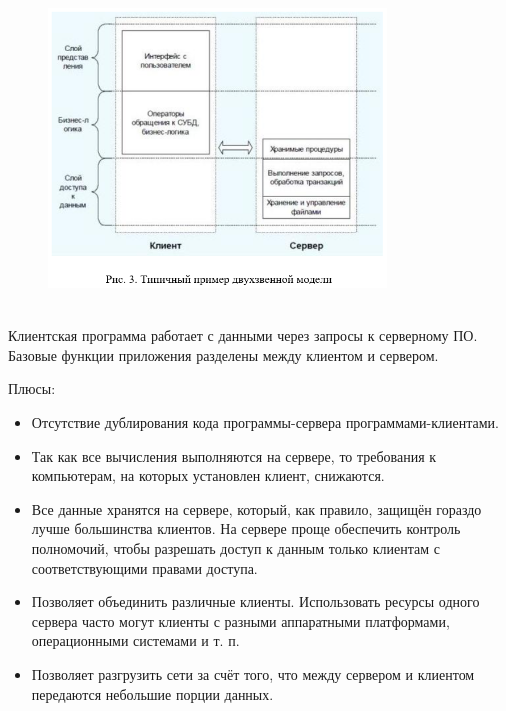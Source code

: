 \begin{figure}[h!]
    \centering
    \includegraphics[width=0.8\textwidth]{assets/663}
\end{figure}~\\

Клиентская программа работает с данными через запросы к серверному ПО. Базовые
функции приложения разделены между клиентом и сервером.

Плюсы:
\begin{itemize}
    \item Отсутствие дублирования кода программы-сервера программами-клиентами.
    \item Так как все вычисления выполняются на сервере, то требования к компьютерам, на которых установлен клиент, снижаются.
    \item Все данные хранятся на сервере, который, как правило, защищён гораздо лучше большинства клиентов. На сервере проще обеспечить контроль полномочий, чтобы разрешать доступ к данным только клиентам с соответствующими правами доступа.
    \item Позволяет объединить различные клиенты. Использовать ресурсы одного сервера часто могут клиенты с разными аппаратными платформами, операционными системами и т. п.
    \item Позволяет разгрузить сети за счёт того, что между сервером и клиентом передаются небольшие порции данных.
\end{itemize}

